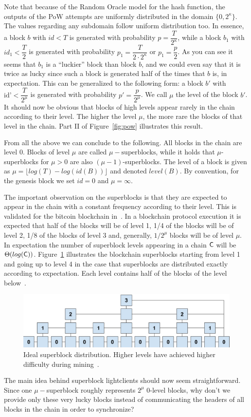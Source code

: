 Note that because of the Random Oracle model for the hash function, the outputs of the PoW attempts are uniformly distributed in the domain $\{0, 2^{\kappa} \}$.
The values regarding any subdomain follow uniform distribution too.
In essence, a block $b$ with $id < T$ is generated with probability $p = \dfrac{T}{2^\kappa}$, while a block $b_1$ with $id_1 < \dfrac{T}{2}$ is generated with probability $p_1 = \dfrac{T}{2 \cdot 2^\kappa} $ or $p_1 = \dfrac{p}{2}$. As you can see it seems that $b_1$ is a ``luckier'' block than block $b$, and we could even say that it is twice as lucky since such a block is generated half of the times that $b$ is, in expectation. This can be generalized to the following form: a block $b'$ with $\text{id'} < \dfrac{T}{2^\mu}$ is generated with probability $p' = \dfrac{p}{2^\mu}$. We call $\mu$ the level of the block $b'$.
It should now be obvious that blocks of high levels appear rarely in the chain according to their level. The higher the level $\mu$, the more rare the blocks of that level in the chain. Part II of Figure~\ref{fig:pow} illustrates this result.

From all the above we can conclude to the following. All blocks in the chain are level 0. Blocks of level $\mu$ are called $\mu-\text{superblocks}$, while it holds that $\mu$-superblocks for $\mu > 0$ are also $(\mu -1)$-superblocks. The level of a block is given as $\mu = \lfloor log(T) - log(id(B)) \rfloor$ and denoted $level(B)$. By convention, for the genesis block we set $id = 0$ and $\mu = \infty$.

The important observation on the superblocks is that they are expected to appear in the chain with a constant frequency according to their level. This is validated for the bitcoin blockchain in~\cite{compactsuperblocks}. In a blockchain protocol execution it is expected that half of the blocks will be of level 1, 1/4 of the blocks will be of level 2, 1/8 of the blocks of level 3 and, generally, $1 / 2^\mu$ blocks will be of level $\mu$. In expectation the number of superblock levels appearing in a chain $\mathsf{C}$ will be $\Theta(log(\mathsf{C}))$. Figure~\ref{fig:superblock_distribution} illustrates the blockchain superblocks starting from level 1 and going up to level 4 in the case that superblocks are distributed exactly according to expectation. Each level contains half of the blocks of the level below~\cite{nipopows}.

\begin{figure}[h!]
	\begin{center}
		\includegraphics[width=0.8\columnwidth]{figures/superblock-distribution.pdf}
	\end{center}
	\caption{Ideal superblock distribution. Higher levels have achieved higher difficulty during mining~\cite{nipopows}.}
	\label{fig:superblock_distribution}
\end{figure}

The main idea behind superblock lightclients should now seem straightforward. Since one $\mu-$superblock roughly represents $2^\mu$ 0-level blocks, why don't we provide only these very lucky blocks instead of communicating the headers of all blocks in the chain in order to synchronize?